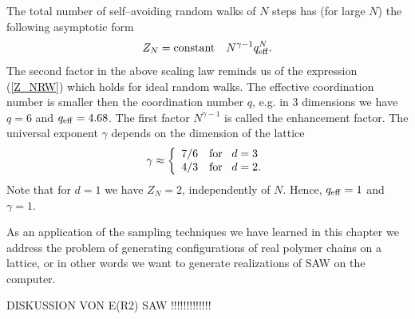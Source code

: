 The total number of self--avoiding random walks of $N$  steps has 
(for large $N$) the following asymptotic form
\begin{equation*}
Z_N = {\rm constant} \quad N^{\gamma-1} q_{\rm eff}^N.
\end{equation*}
The second factor in the above scaling law reminds us of the expression
(\ref{Z_NRW})  which holds for ideal random walks. The effective 
coordination number is smaller then the coordination number $q$, 
e.g. in 3 dimensions we have $q=6$ and $q_{\rm eff}=4.68$. The first factor
$N^{\gamma -1}$  is called the enhancement factor. The universal
exponent $\gamma$ depends on the dimension of the lattice
\begin{equation*}
\gamma \approx \left\{ \begin{array}{cl}
                        7/6 & {\rm for} \;\;\; d=3 \\
                        4/3 & {\rm for} \;\;\; d=2.
                       \end{array}
               \right.
\end{equation*}
Note that for $d=1$ we have $Z_N = 2$, independently of $N$. 
Hence, $q_{\rm eff} = 1$ and $\gamma =1$.

As an application of the sampling techniques we have learned in 
this chapter we address the problem of generating 
configurations of real polymer chains on a lattice, or in other 
words we want to generate realizations of SAW on the computer.

DISKUSSION VON E(R2) SAW !!!!!!!!!!!!!

